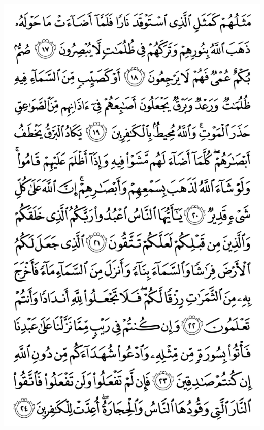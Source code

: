 \documentclass[10pt]{article}
\begin{document}
\begin{center}
\includegraphics[width=\textwidth,height=\textheight,keepaspectratio]{images/004.png}
\end{center}
\end{document}
